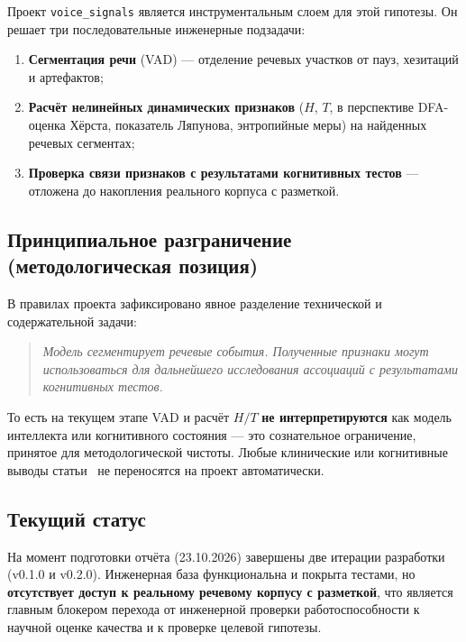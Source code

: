 \documentclass[12pt,a4paper]{article}
\begin{document}
Проект \texttt{voice\_signals} является инструментальным слоем для этой
гипотезы. Он решает три последовательные инженерные подзадачи:

\begin{enumerate}
  \item \textbf{Сегментация речи} (VAD) — отделение речевых участков от пауз,
  хезитаций и артефактов;
  \item \textbf{Расчёт нелинейных динамических признаков} ($H$, $T$,
  в перспективе DFA-оценка Хёрста, показатель Ляпунова, энтропийные меры) на
  найденных речевых сегментах;
  \item \textbf{Проверка связи признаков с результатами когнитивных тестов}
  — отложена до накопления реального корпуса с разметкой.
\end{enumerate}

\subsection{Принципиальное разграничение (методологическая позиция)}

В правилах проекта зафиксировано явное разделение технической и содержательной
задачи:

\begin{quote}
\itshape
Модель сегментирует речевые события. Полученные признаки могут использоваться
для дальнейшего исследования ассоциаций с результатами когнитивных тестов.
\end{quote}

То есть на текущем этапе VAD и расчёт $H/T$ \textbf{не интерпретируются} как
модель интеллекта или когнитивного состояния — это сознательное ограничение,
принятое для методологической чистоты. Любые клинические или когнитивные
выводы статьи~\cite{kuzenkov2014} не переносятся на проект автоматически.

\subsection{Текущий статус}

На момент подготовки отчёта (23.10.2026) завершены две итерации разработки
(v0.1.0 и v0.2.0). Инженерная база функциональна и покрыта тестами, но
\textbf{отсутствует доступ к реальному речевому корпусу с разметкой}, что
является главным блокером перехода от инженерной проверки работоспособности
к научной оценке качества и к проверке целевой гипотезы.

\end{document}
